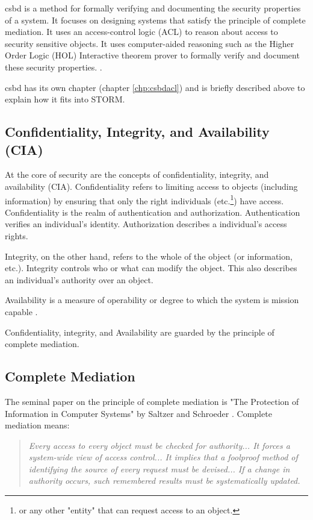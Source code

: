 \documentclass[../../main/main.tex]{subfiles}
\begin{document}
\gls{csbd} is a method for formally verifying and documenting the security properties of a system.  It focuses on designing systems that satisfy the principle of complete mediation.  It uses an access-control logic (ACL) to reason about access to security sensitive objects.  It uses computer-aided reasoning such as the Higher Order Logic (HOL) Interactive theorem prover to formally verify and document these security properties.  .

\gls{csbd} has its own chapter (chapter \ref{chp:csbdacl}) and is briefly described above to explain how it fits into STORM.

\subsection{Confidentiality, Integrity, and Availability (CIA) }\label{sssect:ssmts}
At the core of security are the concepts of confidentiality, integrity, and availability (CIA).  Confidentiality refers to limiting access to objects (including information) by ensuring that only the right individuals (etc.\footnote{or any other "entity" that can request access to an object.}) have access.  Confidentiality is the realm of authentication and authorization.  Authentication verifies an individual's identity.  Authorization describes a individual's access rights. 

Integrity, on the other hand, refers to the whole of the object (or information, etc.). Integrity controls who or what can modify the object. This also describes an individual's authority over an object.

Availability is a measure of operability or degree to which the system is mission capable \cite {availability}. 

Confidentiality, integrity, and Availability are guarded by the principle of complete mediation.  


\subsection{Complete Mediation}\label{sssec:strommediate}
The seminal paper on the principle of complete mediation is "The Protection of Information in Computer Systems" by Saltzer and Schroeder \cite{saltzer}.  Complete mediation means:
\begin{quote}
\textit{
Every access to every object must be checked for authority... It forces a system-wide view of access control... It implies that a foolproof method of identifying the source of every request must be devised... If a change in authority occurs, such remembered results must be systematically updated.} 
\end{quote}
\end{document}
